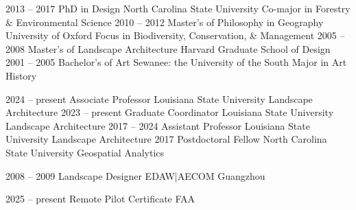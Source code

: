 \documentclass[10pt]{designcv}
\begin{document}
\vspace*{-0.2cm}

\begin{entrylist}
	\entry
		{2013 -- 2017}
		{PhD in Design}
		{North Carolina State University}
		{Co-major in Forestry \& Environmental Science}
	\entry
		{2010 -- 2012}
		{Master's of Philosophy in Geography} %
		{University of Oxford}
		{Focus in Biodiversity, Conservation, \& Management}
	\entry
		{2005 -- 2008}
		{Master's of Landscape Architecture}
		{Harvard Graduate School of Design}
		{\vspace*{-1em}}
	\entry
		{2001 -- 2005}
		{Bachelor's of Art}
		{Sewanee: the University of the South}
		{Major in Art History}
\end{entrylist}




\begin{entrylist}
	\entry
		{2024 -- present}
		{Associate Professor}
		{Louisiana State University}
		{Landscape Architecture}
	\entry
		{2023 -- present}
		{Graduate Coordinator}
		{Louisiana State University}
		{Landscape Architecture}
	\entry
		{2017 -- 2024}
		{Assistant Professor}
		{Louisiana State University}
		{Landscape Architecture}
	\entry
		{2017}
		{Postdoctoral Fellow}
		{North Carolina State University}
		{Geospatial Analytics}
\end{entrylist}


\begin{entrylist}
	\entry
		{2008 -- 2009}
		{Landscape Designer}
		{EDAW|AECOM Guangzhou}
		{}
\end{entrylist}


\begin{entrylist}
	\entry
		{2025 -- present}
		{Remote Pilot Certificate}
		{FAA}
		{}
\end{entrylist}

\clearpage

\end{document}
